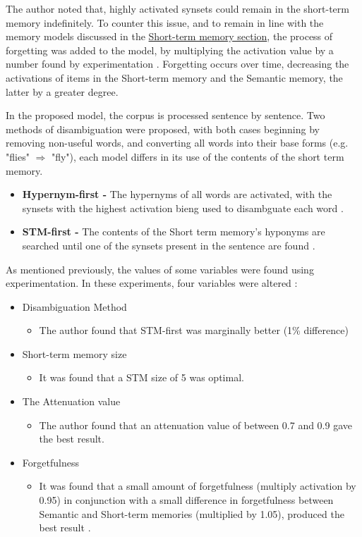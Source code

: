 \documentclass[]{article}
\begin{document}
The author noted that, highly activated synsets could remain in the short-term memory indefinitely. To counter this issue, and to remain in line with the memory models discussed in the \hyperref[ShortTerm]{Short-term memory section}, the process of forgetting was added to the model, by multiplying the activation value by a number found by experimentation \cite{MattBurkePrevious}. Forgetting occurs over time, decreasing the activations of items in the Short-term memory and the Semantic memory, the latter by a greater degree.

In the proposed model, the corpus is processed sentence by sentence. Two methods of disambiguation were proposed, with both cases beginning by removing non-useful words, and converting all words into their base forms (e.g. "flies" $\Rightarrow$ "fly"), each model differs in its use of the contents of the short term memory.
\begin{itemize}
	\item[] \textbf{Hypernym-first - } The hypernyms of all words are activated, with the synsets with the highest activation bieng used to disambguate each word \cite{MattBurkePrevious}.
	\item[] \textbf{STM-first - } The contents of the Short term memory's hyponyms are searched until one of the synsets present in the sentence are found \cite{MattBurkePrevious}.
\end{itemize}


As mentioned previously, the values of some variables were found using experimentation. In these experiments, four variables were altered \cite{MattBurkePrevious}:
\begin{itemize}
	\item Disambiguation Method
	\begin{itemize}
		\item[] The author found that STM-first was marginally better (1\% difference)
	\end{itemize}
	\item Short-term memory size
	\begin{itemize}
		\item[] It was found that a STM size of 5 was optimal.
	\end{itemize}
	\item The Attenuation value
	\begin{itemize}
		\item[] The author found that an attenuation value of between 0.7 and 0.9 gave the best result.
	\end{itemize}
	\item Forgetfulness
	\begin{itemize}
		\item[] It was found that a small amount of forgetfulness (multiply activation by 0.95) in conjunction with a small difference in forgetfulness between Semantic and Short-term memories (multiplied by 1.05), produced the best result \cite{MattBurkePrevious}.
	\end{itemize}
\end{itemize}
\end{document}
